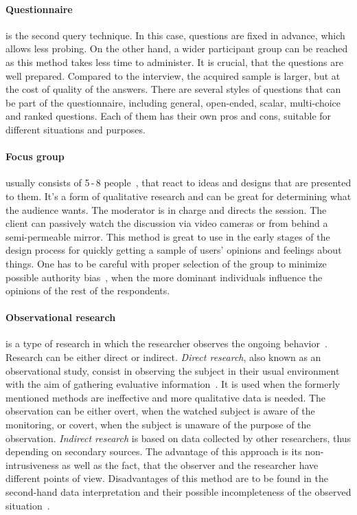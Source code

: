 \paragraph{Questionnaire}
is the second query technique. In this case, questions are fixed in advance, which allows less probing. On the other hand, a wider participant group can be reached as this method takes less time to administer. It is crucial, that the questions are well prepared. Compared to the interview, the acquired sample is larger, but at the cost of quality of the answers. There are several styles of questions that can be part of the questionnaire, including general, open-ended, scalar, multi-choice and ranked questions. Each of them has their own pros and cons, suitable for different situations and purposes.

\paragraph{Focus group}
usually consists of 5\,-\,8 people~\cite{Krug}, that react to ideas and designs that are presented to them. It’s a form of qualitative research and can be great for determining what the audience wants. The moderator is in charge and directs the session. The client can passively watch the discussion via video cameras or from behind a semi-permeable mirror. This method is great to use in the early stages of the design process for quickly getting a sample of users’ opinions and feelings about things. One has to be careful with proper selection of the group to minimize possible authority bias~\cite{AuthorityBias}, when the more dominant individuals influence the opinions of the rest of the respondents.

\paragraph{Observational research}
is a type of research in which the researcher observes the ongoing behavior~\cite{ObservationalResearch}. Research can be either direct or indirect. \textit{Direct research}, also known as an observational study, consist in observing the subject in their usual environment with the aim of gathering evaluative information~\cite{DirectObservation}. 
It is used when the formerly mentioned methods are ineffective and more qualitative data is needed. The observation can be either overt, when the watched subject is aware of the monitoring, or covert, when the subject is unaware of the purpose of the observation. \textit{Indirect research} is based on data collected by other researchers, thus depending on secondary sources. The advantage of this approach is its non-intrusiveness as well as the fact, that the observer and the researcher have different points of view. Disadvantages of this method are to be found in the second-hand data interpretation and their possible incompleteness of the observed situation~\cite{IndirectObservation}.

